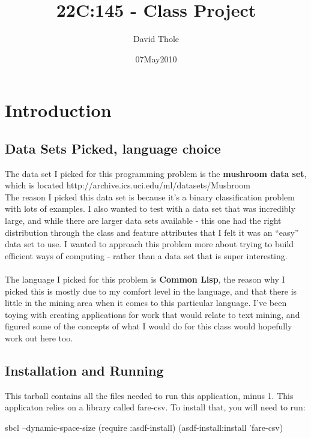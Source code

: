 \documentclass{article}
\begin{document}
\title{22C:145 - Class Project}
\author{David Thole}
\date{07May2010}

\thispagestyle{plain}           %
\tableofcontents
{} %
\cleardoublepage                %

\section{Introduction}
\subsection{Data Sets Picked, language choice}
The data set I picked for this programming problem is the \textbf{mushroom data set}, which is located http://archive.ics.uci.edu/ml/datasets/Mushroom \\
The reason I picked this data set is because it's a binary classification problem with lots of examples.  I also wanted to test with a data set that was incredibly large, and while there are larger data sets available - this one had the right distribution through the class and feature attributes that I felt it was an ``easy'' data set to use.  I wanted to approach this problem more about trying to build efficient ways of computing - rather than a data set that is super interesting. \\
\\
The language I picked for this problem is \textbf{Common Lisp}, the reason why I picked this is mostly due to my comfort level in the language, and that there is little in the mining area when it comes to this particular language.  I've been toying with creating applications for work that would relate to text mining, and figured some of the concepts of what I would do for this class would hopefully work out here too.

\subsection{Installation and Running}
This tarball contains all the files needed to run this application, minus 1.  This applicaton relies on a library called fare-csv.  To install that, you will need to run:

sbcl --dynamic-space-size
(require :asdf-install)
(asdf-install:install 'fare-csv)
\end{document}
